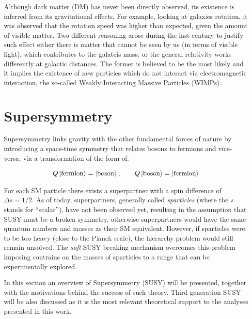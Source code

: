 			Although dark matter (DM) has never been directly observed, its existence is inferred from its gravitational effects. For example, looking at galaxies rotation, it was observed that the rotation speed was higher than expected, given the amount of visible matter. Two different reasoning arose during the last century to justify such effect either there is matter that cannot be seen by us (in terms of visible light), which contributes to the galatcis mass; or the general relativity works differently at galactic distances. The former is believed to be the most likely and it implies the existence of new particles which do not interact via electromagnetic interaction, the so-called Weakly Interacting Massive Particles (WIMPs).





	\section{Supersymmetry}
	\label{sec:SUSY}

		Supersymmetry links gravity with the other fundamental forces of nature by introducing a space-time symmetry that relates bosons to fermions and vice-versa, via a transformation of the form of:  

		\begin{equation}
		\label{eq:susy_transformation}
			Q \ket{\mathrm{fermion}} = \ket{\mathrm{boson}}, \qquad Q \ket{\mathrm{boson}} = \ket{\mathrm{fermion}}
		\end{equation}

		\noindent For each SM particle there exists a superpartner with a spin difference of $\Delta s = 1/2$. As of today, superpartners, generally called \emph{sparticles} (where the \emph{s} stands for ``scalar''), have not been observed yet, resulting in the assumption that SUSY must be a broken symmetry, otherwise superpartners would have the same quantum numbers and masses as their SM equivalent. However, if sparticles were to be too heavy (close to the Planck scale), the hierarchy problem would still remain unsolved. The \emph{soft} SUSY breaking mechanism overcomes this problem imposing contrains on the masses of sparticles to a range that can be experimentally explored. 

		In this section an overview of Supersymmetry (SUSY) will be presented, together with the motivations behind the success of such theory. Third generation SUSY will be also discussed as it is the most relevant theoretical support to the analyses presented in this work. 
		
